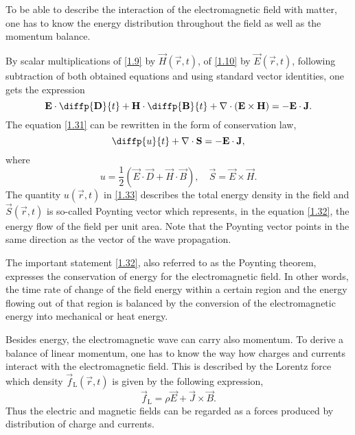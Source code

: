 To be able to describe the interaction of the electromagnetic field with matter, one has to know the energy distribution throughout the field as well as the momentum balance.

By scalar multiplications of \ref{1.9} by $ \vec{H}\left( \vec{r}, t \right) $, of \ref{1.10} by $ \vec{E}\left( \vec{r}, t \right) $, following subtraction of both obtained equations and using standard vector identities, one gets the expression 
\begin{equation}
\label{1.31}
\vec{E} \cdot \diffp{\vec{D}}{t} + \vec{H} \cdot \diffp{\vec{B}}{t} + \div{\left(\vec{E} \times \vec{H} \right)} = -\vec{E} \cdot \vec{J}.
\end{equation}
The equation \ref{1.31} can be rewritten in the form of conservation law,
\begin{equation}
\label{1.32}
\diffp{u}{t} + \div{\vec{S}} = - \vec{E} \cdot \vec{J},
\end{equation}
where
\begin{equation}
\label{1.33}
u = \frac{1}{2} \left(\vec{E} \cdot \vec{D} + \vec{H} \cdot \vec{B} \right), \quad \vec{S} = \vec{E} \times \vec{H}.
\end{equation}
The quantity $ u\left( \vec{r}, t \right) $ in \ref{1.33} describes the total energy density in the field and $ \vec{S}\left( \vec{r}, t \right) $ is so-called Poynting vector which represents, in the equation \ref{1.32}, the energy flow of the field per unit area. Note that the Poynting vector points in the same direction as the vector of the wave propagation.

The important statement \ref{1.32}, also referred to as the Poynting theorem, expresses the conservation of energy for the electromagnetic field. In other words, the time rate of change of the field energy within a certain region and the energy flowing out of that region is balanced by the conversion of the electromagnetic energy into mechanical or heat energy.

Besides energy, the electromagnetic wave can carry also momentum. To derive a balance of linear momentum, one has to know the way how charges and currents interact with the electromagnetic field. This is described by the Lorentz force which density $ \vec{f}_\mathrm{L} \left( \vec{r}, t \right) $ is given by the following expression,
\begin{equation}
\label{1.51}
\vec{f}_\mathrm{L} = \rho \vec{E} + \vec{J} \times \vec{B}.
\end{equation}
Thus the electric and magnetic fields can be regarded as a forces produced by distribution of charge and currents.

